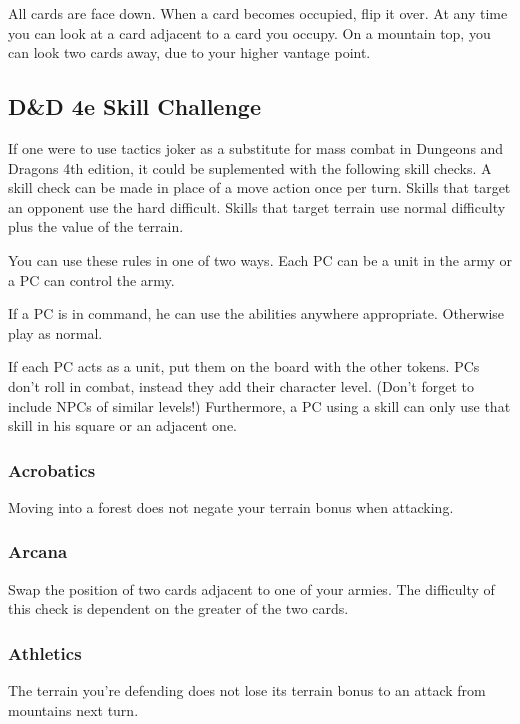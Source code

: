 \documentclass{article}
\begin{document}
All cards are face down.  When a card becomes occupied, flip it over.   At any time you can look at a card adjacent to a card you occupy.  On a mountain top, you can look two cards away, due to your higher vantage point.

\subsection{D\&D 4e Skill Challenge}

If one were to use tactics joker as a substitute for mass combat in Dungeons and Dragons 4th edition, it could be suplemented with the following skill checks.  A skill check can be made in place of a move action once per turn.  Skills that target an opponent use the hard difficult.  Skills that target terrain use normal difficulty plus the value of the terrain.

You can use these rules in one of two ways.  Each PC can be a unit in the army or a PC can control the army.

If a PC is in command, he can use the abilities anywhere appropriate.  Otherwise play as normal.

If each PC acts as a unit, put them on the board with the other tokens.  PCs don't roll in combat, instead they add their character level.  (Don't forget to include NPCs of similar levels!)  Furthermore, a PC using a skill can only use that skill in his square or an adjacent one.

\subsubsection{Acrobatics}

Moving into a forest does not negate your terrain bonus when attacking.

\subsubsection{Arcana}

Swap the position of two cards adjacent to one of your armies.  The difficulty of this check is dependent on the greater of the two cards.  

\subsubsection{Athletics}

The terrain you're defending does not lose its terrain bonus to an attack from mountains next turn.
\end{document}
